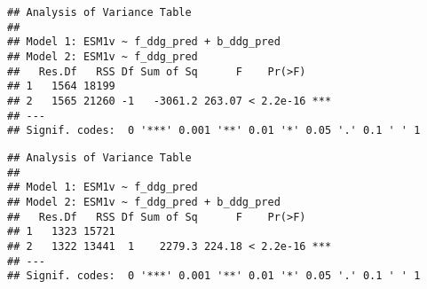 \documentclass[
]{article}
\newenvironment{Shaded}{\begin{snugshade}}{\end{snugshade}}
\newcommand{\CommentTok}[1]{\textcolor[rgb]{0.56,0.35,0.01}{\textit{#1}}}
\newcommand{\FunctionTok}[1]{\textcolor[rgb]{0.13,0.29,0.53}{\textbf{#1}}}
\newcommand{\NormalTok}[1]{#1}
\newcommand{\SpecialCharTok}[1]{\textcolor[rgb]{0.81,0.36,0.00}{\textbf{#1}}}
\begin{document}
\begin{Shaded}
\end{Shaded}

\begin{verbatim}
## Analysis of Variance Table
## 
## Model 1: ESM1v ~ f_ddg_pred + b_ddg_pred
## Model 2: ESM1v ~ f_ddg_pred
##   Res.Df   RSS Df Sum of Sq      F    Pr(>F)    
## 1   1564 18199                                  
## 2   1565 21260 -1   -3061.2 263.07 < 2.2e-16 ***
## ---
## Signif. codes:  0 '***' 0.001 '**' 0.01 '*' 0.05 '.' 0.1 ' ' 1
\end{verbatim}

\begin{Shaded}
\end{Shaded}

\begin{verbatim}
## Analysis of Variance Table
## 
## Model 1: ESM1v ~ f_ddg_pred
## Model 2: ESM1v ~ f_ddg_pred + b_ddg_pred
##   Res.Df   RSS Df Sum of Sq      F    Pr(>F)    
## 1   1323 15721                                  
## 2   1322 13441  1    2279.3 224.18 < 2.2e-16 ***
## ---
## Signif. codes:  0 '***' 0.001 '**' 0.01 '*' 0.05 '.' 0.1 ' ' 1
\end{verbatim}

\begin{Shaded}
\end{Shaded}
\end{document}
